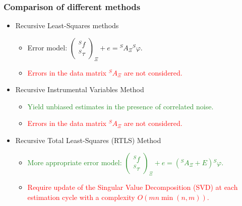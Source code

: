 \documentclass[usenames,dvipsnames]{beamer}
\begin{document}
\begin{frame}
 \frametitle{Comparison of different methods}

 \begin{itemize}
  \item Recursive Least-Squares methods
        \begin{itemize}
         \item Error model: $\begin{pmatrix}
               {}^S f    \\
               {}^S \tau
         \end{pmatrix}_{\Xi}
         + e = {}^S A_{\Xi} {}^S \varphi $.
         \item \textcolor{red}{Errors in the data matrix ${}^S A_{\Xi}$ are not considered.}
        \end{itemize}
  \item Recursive Instrumental Variables Method
        \begin{itemize}
         \item \textcolor{ForestGreen}{Yield unbiased estimates in the presence of correlated noise.}
         \item \textcolor{red}{Errors in the data matrix ${}^S A_{\Xi}$ are not considered.}
        \end{itemize}
  \item Recursive Total Least-Squares (RTLS) Method
        \begin{itemize}
         \item \textcolor{ForestGreen}{More appropriate error model: $\begin{pmatrix}
                     {}^S f    \\
                     {}^S \tau
               \end{pmatrix}_{\Xi}
               + e = ({}^S A_{\Xi} + E) {}^S \varphi $.}
         \item \textcolor{red}{Require update of the Singular Value Decomposition (SVD) at each estimation cycle with a complexity $O(mn \min(n, m))$.}
        \end{itemize}
 \end{itemize}
\end{frame}
\end{document}
